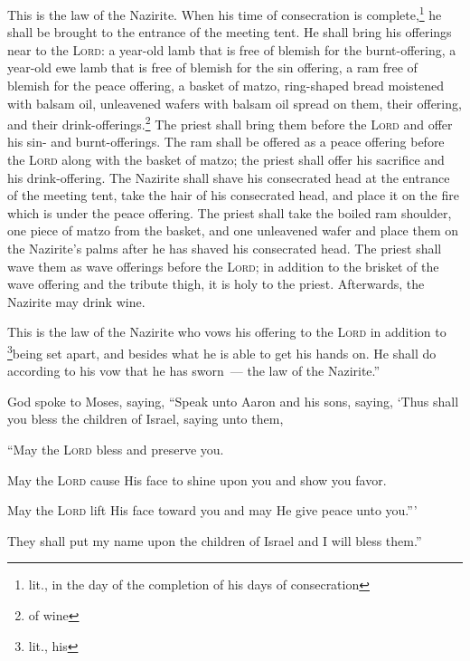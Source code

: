 \begin{inparaenum}
     This is the law of the Nazirite. When his time of consecration is complete,\footnote{lit., in the day of the completion of his days of consecration} he shall be brought to the entrance of the meeting tent.%
     He shall bring his offerings near to the \textsc{Lord}: a year-old lamb that is free of blemish for the burnt-offering, a year-old ewe lamb that is free of blemish for the sin offering, a ram free of blemish for the peace offering,%
     a basket of matzo, ring-shaped bread moistened with balsam oil, unleavened wafers with balsam oil spread on them, their offering, and their drink-offerings.\footnote{of wine}%
     The priest shall bring them before the \textsc{Lord} and offer his sin- and burnt-offerings.%
     The ram shall be offered as a peace offering before the \textsc{Lord} along with the basket of matzo; the priest shall offer his sacrifice and his drink-offering.%
     The Nazirite shall shave his consecrated head at the entrance of the meeting tent, take the hair of his consecrated head, and place it on the fire which is under the peace offering.%
     The priest shall take the boiled ram shoulder, one piece of matzo from the basket, and one unleavened wafer and place them on the Nazirite's palms after he has shaved his consecrated head.%
     The priest shall wave them as wave offerings before the \textsc{Lord}; in addition to the brisket of the wave offering and the tribute thigh, it is holy to the priest. Afterwards, the Nazirite may drink wine.%
    
     This is the law of the Nazirite who vows his offering to the \textsc{Lord} in addition to \footnote{lit., his}being set apart, and besides what he is able to get his hands on. He shall do according to his vow that he has sworn~--- the law of the Nazirite.''%
    
     God spoke to Moses, saying,%
     ``Speak unto Aaron and his sons, saying, `Thus shall you bless the children of Israel, saying unto them,%
    
     ``May the \textsc{Lord} bless and preserve you.%
    
     May the \textsc{Lord} cause His face to shine upon you and show you favor.%
    
     May the \textsc{Lord} lift His face toward you and may He give peace unto you.''\thinspace'%
    
     They shall put my name upon the children of Israel and I will bless them.''%
\end{inparaenum}
